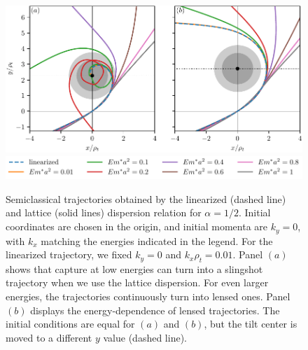 \documentclass[submission, Phys]{SciPost}
\begin{document}
\begin{figure}[ht]
    \centering
    \includegraphics[width=\textwidth]{fig/linearized_vs_lattice.pdf}
    \includegraphics[width=\textwidth]{fig/linearized_vs_lattice_legend.pdf}
    \caption{Semiclassical trajectories obtained by the linearized (dashed line) and lattice (solid lines) dispersion relation for $\alpha=1/2$. Initial coordinates are chosen in the origin, and initial momenta are $k_y=0$, with $k_x$ matching the energies indicated in the legend. For the linearized trajectory, we fixed $k_y=0$ and $k_x\rho_t=0.01$. Panel $(a)$ shows that capture at low energies can turn into a slingshot trajectory when we use the lattice dispersion. For even larger energies, the trajectories continuously turn into lensed ones. Panel $(b)$ displays the energy-dependence of lensed trajectories. The initial conditions are equal for $(a)$ and $(b)$, but the tilt center is moved to a different $y$ value (dashed line).}
    \label{fig:lattice_vs_linearized_dispersion}
\end{figure}
\end{document}
